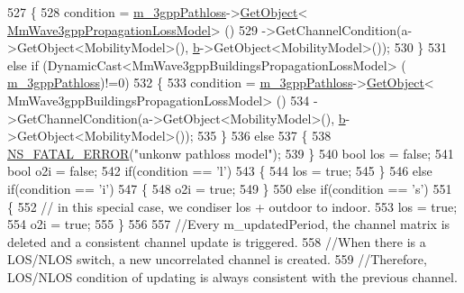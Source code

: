 \begin{DoxyCode}
527         \{
528                 condition = \hyperlink{classns3_1_1MmWave3gppChannel_add8860051acacb1819be2f7321dbd726}{m\_3gppPathloss}->\hyperlink{classns3_1_1Object_a13e18c00017096c8381eb651d5bd0783}{GetObject}<
      \hyperlink{classMmWave3gppPropagationLossModel}{MmWave3gppPropagationLossModel}> ()
529                                 ->GetChannelCondition(a->GetObject<MobilityModel>(),
      \hyperlink{buildings__pathloss_8m_a21ad0bd836b90d08f4cf640b4c298e7c}{b}->GetObject<MobilityModel>());
530         \}
531         \textcolor{keywordflow}{else} \textcolor{keywordflow}{if} (DynamicCast<MmWave3gppBuildingsPropagationLossModel> (
      \hyperlink{classns3_1_1MmWave3gppChannel_add8860051acacb1819be2f7321dbd726}{m\_3gppPathloss})!=0)
532         \{
533                 condition = \hyperlink{classns3_1_1MmWave3gppChannel_add8860051acacb1819be2f7321dbd726}{m\_3gppPathloss}->\hyperlink{classns3_1_1Object_a13e18c00017096c8381eb651d5bd0783}{GetObject}<
      MmWave3gppBuildingsPropagationLossModel> ()
534                                 ->GetChannelCondition(a->GetObject<MobilityModel>(),
      \hyperlink{buildings__pathloss_8m_a21ad0bd836b90d08f4cf640b4c298e7c}{b}->GetObject<MobilityModel>());
535         \}
536         \textcolor{keywordflow}{else}
537         \{
538                 \hyperlink{group__fatal_ga5131d5e3f75d7d4cbfd706ac456fdc85}{NS\_FATAL\_ERROR}(\textcolor{stringliteral}{"unkonw pathloss model"});
539         \}
540         \textcolor{keywordtype}{bool} los = \textcolor{keyword}{false};
541         \textcolor{keywordtype}{bool} o2i = \textcolor{keyword}{false};
542         \textcolor{keywordflow}{if}(condition == \textcolor{charliteral}{'l'})
543         \{
544                 los = \textcolor{keyword}{true};
545         \}
546         \textcolor{keywordflow}{else} \textcolor{keywordflow}{if}(condition == \textcolor{charliteral}{'i'})
547         \{
548                 o2i = \textcolor{keyword}{true};
549         \}
550         \textcolor{keywordflow}{else} \textcolor{keywordflow}{if}(condition == \textcolor{charliteral}{'s'})
551         \{
552                 \textcolor{comment}{// in this special case, we condiser los + outdoor to indoor.}
553                 los = \textcolor{keyword}{true};
554                 o2i = \textcolor{keyword}{true};
555         \}
556 
557         \textcolor{comment}{//Every m\_updatedPeriod, the channel matrix is deleted and a consistent channel update is
       triggered.}
558         \textcolor{comment}{//When there is a LOS/NLOS switch, a new uncorrelated channel is created.}
559         \textcolor{comment}{//Therefore, LOS/NLOS condition of updating is always consistent with the previous channel.}

\end{DoxyCode}
